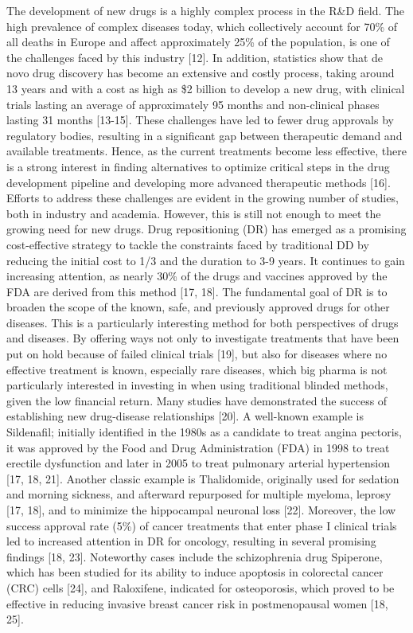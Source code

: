 The development of new drugs is a highly complex process in the R\&D field. The high prevalence of complex diseases today, which collectively account for 70\% of all deaths in Europe and affect approximately 25\% of the population, is one of the challenges faced by this industry [12]. In addition, statistics show that de novo drug discovery has become an extensive and costly process, taking around 13 years and with a cost as high as \$2 billion to develop a new drug, with clinical trials lasting an average of approximately 95 months and non-clinical phases lasting 31 months [13-15]. These challenges have led to fewer drug approvals by regulatory bodies, resulting in a significant gap between therapeutic demand and available treatments. Hence, as the current treatments become less effective, there is a strong interest in finding alternatives to optimize critical steps in the drug development pipeline and developing more advanced therapeutic methods [16]. Efforts to address these challenges are evident in the growing number of studies, both in industry and academia. However, this is still not enough to meet the growing need for new drugs. 
Drug repositioning (DR) has emerged as a promising cost-effective strategy to tackle the constraints faced by traditional DD by reducing the initial cost to 1/3 and the duration to 3-9 years. It continues to gain increasing attention, as nearly 30\% of the drugs and vaccines approved by the FDA are derived from this method [17, 18]. The fundamental goal of DR is to broaden the scope of the known, safe, and previously approved drugs for other diseases. This is a particularly interesting method for both perspectives of drugs and diseases. By offering ways not only to investigate treatments that have been put on hold because of failed clinical trials [19], but also for diseases where no effective treatment is known, especially rare diseases, which big pharma is not particularly interested in investing in when using traditional blinded methods, given the low financial return. Many studies have demonstrated the success of establishing new drug-disease relationships [20]. A well-known example is Sildenafil; initially identified in the 1980s as a candidate to treat angina pectoris, it was approved by the Food and Drug Administration (FDA) in 1998 to treat erectile dysfunction and later in 2005 to treat pulmonary arterial hypertension [17, 18, 21]. Another classic example is Thalidomide, originally used for sedation and morning sickness, and afterward repurposed for multiple myeloma, leprosy [17, 18], and to minimize the hippocampal neuronal loss [22]. Moreover, the low success approval rate (5\%) of cancer treatments that enter phase I clinical trials led to increased attention in DR for oncology, resulting in several promising findings [18, 23]. Noteworthy cases include the schizophrenia drug Spiperone, which has been studied for its ability to induce apoptosis in colorectal cancer (CRC) cells [24], and Raloxifene, indicated for osteoporosis, which proved to be effective in reducing invasive breast cancer risk in postmenopausal women [18, 25].
